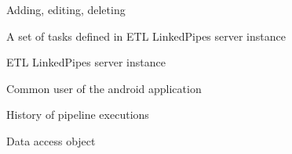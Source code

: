 \item[Managing] Adding, editing, deleting
\item[Pipeline] A set of tasks defined in ETL LinkedPipes server instance
\item[Server instance] ETL LinkedPipes server instance
\item[User] Common user of the android application
\item[History] History of pipeline executions
\item[DAO] Data access object